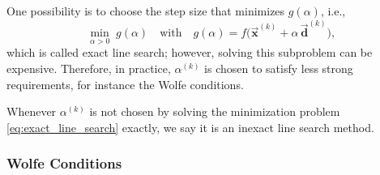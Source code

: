 \documentclass[9pt, headings=standardclasses, parskip=half]{scrartcl}
\renewcommand{\emph}[1]{\textcolor{mypurple}{#1}}
\newcommand{\vect}[1]{\vec{\boldsymbol{#1}}}
\begin{document}
One possibility is to choose the step size that minimizes \(g(\alpha)\), i.e.,
\begin{equation}
\label{eq:exact_line_search}
\min_{\alpha > 0} \; g(\alpha) \quad \text{with} \quad g(\alpha)=f\bigl(\vect{x}^{(k)} + \alpha\, \vect{d}^{(k)}\bigr) \text{,}
\end{equation}
which is called \emph{exact line search}; however, solving this subproblem can be expensive. Therefore, in practice, \(\alpha^{(k)}\) is chosen to satisfy less strong requirements, for instance the Wolfe conditions.

\begin{remark}
Whenever \(\alpha^{(k)}\) is \emph{not} chosen by solving the minimization problem \eqref{eq:exact_line_search} exactly, we say it is an \emph{inexact line search} method.
\end{remark}



\subsubsection{Wolfe Conditions}
\end{document}
